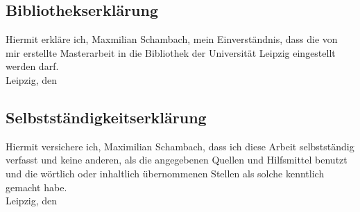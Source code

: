 \documentclass[12pt,a4paper,twoside]{scrartcl}
\begin{document}
\subsection*{Bibliothekserkl\"arung}
Hiermit erkläre ich, Maxmilian Schambach, mein Einverständnis, dass die von mir erstellte Masterarbeit in die Bibliothek der
Universit\"at Leipzig eingestellt werden darf.\\[2ex]

\noindent
Leipzig, den
\vspace{3cm}



\subsection*{Selbstst\"andigkeitserkl\"arung}
Hiermit versichere ich, Maximilian Schambach, dass ich diese Arbeit selbstständig verfasst und keine anderen, als die angegebenen Quellen und Hilfsmittel benutzt und die wörtlich oder inhaltlich übernommenen Stellen als solche kenntlich gemacht habe. \\[2ex]

\noindent
Leipzig, den


%
%


\newpage
\printglossaries
\newpage \noindent
\printbibliography[heading=bibintoc,title={References}]
%
\end{document}
